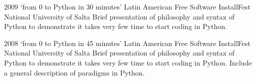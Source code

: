 \documentclass[11pt,a4paper]{moderncv}
\begin{document}
\cventry                                                                                                          %
    {2009}                                                                                                        %
    {`from 0 to Python in 30 minutes'}                                                                            %
    {Latin American Free Software InstallFest}                                                                    %
    {National University of Salta}                                                                                %
    {}                                                                                                            %
    {                                                                                                             %
        Brief presentation of philosophy and syntax of Python                                                     %
        to demonstrate it takes very few time to start                                                            %
        coding in Python.                                                                                         %
    }                                                                                                             %

\cventry                                                                                                          %
    {2008}                                                                                                        %
    {`from 0 to Python in 45 minutes'}                                                                            %
    {Latin American Free Software InstallFest}                                                                    %
    {National University of Salta}                                                                                %
    {}                                                                                                            %
    {                                                                                                             %
        Brief presentation of philosophy and syntax of Python                                                     %
        to demonstrate it takes very few time to start                                                            %
        coding in Python.                                                                                         %
        Include a general description of paradigms in Python.                                                     %
    }                                                                                                             %
\end{document}
